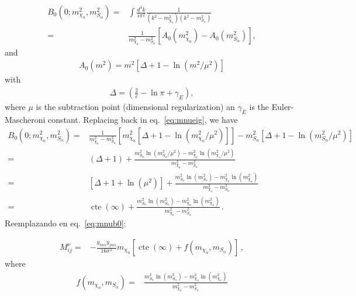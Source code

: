 \begin{align}
  \label{eq:mnueig}
  B_0 \left(0;m_{\chi_n}^2,m^2_{S_{\alpha}} \right)=&\int \frac{d^4k}{i\pi^2}\frac{1}{\left(k^2-m_{\chi_n}^2\right)\left(k^2-m_{S_\alpha}^2\right)}\nonumber\\
            =&\frac{1}{m_{\chi_n}^2-m_{S_\alpha}^2}\left[ A_0\left(m_{\chi_n}^2\right)-A_0\left(m_{S_\alpha}^2\right)  \right],
\end{align}
and
\begin{align*}
  A_0\left(m^2\right)=m^2 \left[ \Delta+1-\ln \left( m^2/\mu^2 \right) \right]
\end{align*}
with
\begin{align*}
  \Delta=\left( \frac{2}{\epsilon}-\ln\pi+\gamma_E \right),
\end{align*}
where $\mu$ is the subtraction point (dimensional regularization) an $\gamma_E$ is the Euler-Mascheroni constant.
Replacing back in eq.~\eqref{eq:mnueig}, we have
\begin{align}
   B_0 \left(0;m_{\chi_n}^2,m^2_{S_{\alpha}} \right)=&
   \frac{1}{m_{\chi_n}^2-m_{S_\alpha}^2}\left[m^2_{\chi_n} \left[ \Delta+1-\ln \left( m_{\chi_n}^2/\mu^2 \right) \right]  \right] 
-m_{S_\alpha}^2 \left[ \Delta+1-\ln \left( m_{S_\alpha}^2/\mu^2 \right) \right] \nonumber\\
=&(\Delta+1)+\frac{m_{S_\alpha}^2\ln \left( m_{S_\alpha}^2/\mu^2 \right)-m_{\chi_n}^2\ln \left( m_{\chi_n}^2/\mu^2 \right)}{m_{\chi_n}^2-m_{S_\alpha}^2} \nonumber\\
=&\left[\Delta+1+\ln\left( \mu^2 \right) \right]+\frac{m_{S_\alpha}^2\ln \left( m_{S_\alpha}^2 \right)-m_{\chi_n}^2\ln \left( m_{\chi_n}^2 \right)}{m_{\chi_n}^2-m_{S_\alpha}^2} \nonumber\\
=&\operatorname{cte}(\infty)+\frac{m_{S_\alpha}^2\ln \left( m_{S_\alpha}^2 \right)-m_{\chi_n}^2\ln \left( m_{\chi_n}^2 \right)}{m_{\chi_n}^2-m_{S_\alpha}^2} \,.
\end{align}
Reemplazando en eq.~\eqref{eq:mnub0}:

\begin{align}
 M^{\nu}_{ij}=&-\frac{y_{i n\alpha}y_{j n\alpha}}{16\pi^2}m_{\chi_n} \left[ \operatorname{cte}(\infty)+
f \left( m_{\chi_n},m_{S_{\alpha}} \right) \right] \,,
\end{align}
where
\begin{align}
f \left( m_{\chi_n},m_{S_{\alpha}} \right)=&  
\frac{m_{S_{\alpha}}^2\ln \left(m_{S_{\alpha}}^2\right)-m_{\chi_n}^2\ln \left(m_{\chi_n}^2  \right)}{m_{\chi_n}^2-m_{S_{\alpha}}^2}
\end{align}

